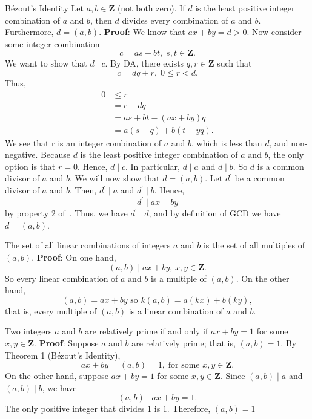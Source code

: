 \begin{Theorem}{Bézout's Identity}{}
    Let $ a,b\in\mathbf{Z} $ (not both zero). If $d$ is
    the least positive integer combination of $a$ and $b$, then $d$ divides every combination
    of $a$ and $b$. Furthermore, $d = (a, b)$.
    \tcblower{}
    \textbf{Proof}: We know that $ ax+by=d>0 $. Now consider some integer combination
    \[ c=as+bt,\; s,t\in\mathbf{Z}. \]
    We want to show that $ d\mid c $. By DA, there exists $ q,r\in\mathbf{Z} $ such that
    \[ c=dq+r,\; 0\le r<d. \]
    Thus,
    \begin{align*}
        0 & \le r            \\
          & =c-dq            \\
          & =as+bt-(ax+by)q  \\
          & =a(s-q)+b(t-yq).
    \end{align*}
    We see that r is an integer combination of $a$ and $b$, which is less than $d$, and
    non-negative. Because $d$ is the least positive integer combination of $a$ and $b$, the
    only option is that $r = 0$. Hence, $ d\mid c $. In particular, $ d\mid a $ and $ d\mid b $.
    So $ d $ is a common divisor of $ a $ and $ b $. We will now show that $ d=(a,b) $. Let $ d^\prime $
    be a common divisor of $ a $ and $ b $. Then, $ d^\prime \mid a $ and $ d^\prime \mid b $. Hence,
    \[ d^\prime \mid ax+by \]
    by property 2 of~. Thus, we have $ d^\prime \mid d $, and by definition of GCD we have
    $ d=(a,b) $.
\end{Theorem}
\begin{Corollary}{}{}
    The set of all linear combinations of integers $a$ and $b$ is the set
    of all multiples of $(a, b)$.
    \tcblower{}
    \textbf{Proof}: On one hand,
    \[ (a,b)\mid ax+by,\, x,y\in\mathbf{Z}. \]
    So every linear combination of $a$ and $b$ is a multiple of $(a, b)$.
    On the other hand,
    \[ (a,b)=ax+by\text{ so }k(a,b)=a(kx)+b(ky), \]
    that is, every multiple of $ (a,b) $ is a linear combination of $ a $ and $ b $.
\end{Corollary}
\begin{Corollary}{}{}
    Two integers $ a $ and $ b $ are relatively prime if and only if $ ax+by=1 $ for some $ x,y\in\mathbf{Z} $.
    \tcblower{}
    \textbf{Proof}: Suppose $ a $ and $ b $ are relatively prime; that is, $ (a,b)=1 $. By Theorem 1 (Bézout's Identity),
    \[ ax+by=(a,b)=1,\;\text{for some }x,y\in\mathbf{Z}. \]
    On the other hand, suppose $ ax+by=1 $ for some $ x,y\in\mathbf{Z} $. Since $ (a,b)\mid a $ and $ (a,b)\mid b $, we have
    \[ (a,b)\mid ax+by=1. \]
    The only positive integer that divides $1$ is $1$. Therefore, $(a, b) = 1$
\end{Corollary}
